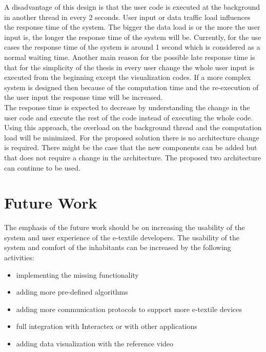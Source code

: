 	A disadvantage of this design is that the user code is executed at the background in another thread in every 2 seconds. User input or data traffic load influences the response time of the system. The bigger the data load is or the more the user input is, the longer the response time of the system will be. Currently, for the use cases the response time of the system is around 1 second which is considered as a normal waiting time. Another main reason for the possible late response time is that for the simplicity of the thesis in every user change the whole user input is executed from the beginning except the visualization codes. If a more complex system is designed then because of the computation time and the re-execution of the user input the response time will be increased. \\ 
 
 The response time is expected to decrease by understanding the change in the user code and execute the rest of the code instead of executing the whole code. Using this approach, the overload on the background thread and the computation load will be minimized. For the proposed solution there is no architecture change is required. There might be the case that the new components can be added but that does not require a change in the architecture. The proposed two architecture can continue to be used.  






\section{Future Work}

The emphasis of the future work should be on increasing the usability of the system and user experience of the e-textile developers. The usability of the system and comfort of the inhabitants can be increased by the following activities:

\begin{itemize}
\item implementing the missing functionality
\item adding more pre-defined algorithms
\item adding more communication protocols to support more e-textile devices
\item full integration with Interactex or with other applications
\item adding data visualization with the reference video
\end{itemize}

